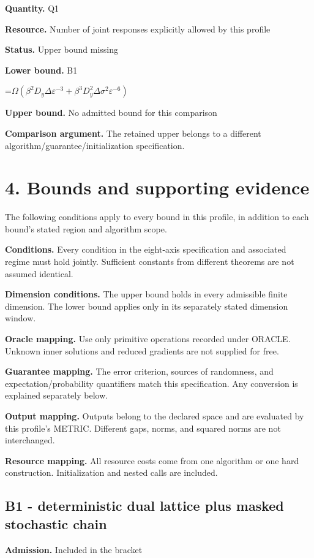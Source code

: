 \documentclass[10pt,a4paper]{article}
\newcommand{\AtlasMath}[1]{\par\begingroup\centering\setbox0=\hbox{$\displaystyle #1$}\ifdim\wd0>1.4\linewidth\typeout{ATLAS WIDE FORMULA: \the\wd0}\fi\ifdim\wd0>\linewidth\resizebox{\linewidth}{!}{\box0}\else\box0\fi\par\endgroup}
\begin{document}
\textbf{Quantity.} Q1

\textbf{Resource.} Number of joint responses explicitly allowed by this profile

\textbf{Status.} Upper bound missing

\textbf{Lower bound.} B1

\AtlasMath{\Omega(\beta^2D_y\Delta\varepsilon^{-3}+\beta^3D_y^2\Delta\sigma^2\varepsilon^{-6})}
\textbf{Upper bound.} No admitted bound for this comparison

\textbf{Comparison argument.} The retained upper belongs to a different algorithm/guarantee/initialization specification.

\section{4. Bounds and supporting evidence}
The following conditions apply to every bound in this profile, in addition to each bound's stated region and algorithm scope.

\textbf{Conditions.} Every condition in the eight-axis specification and associated regime must hold jointly. Sufficient constants from different theorems are not assumed identical.

\textbf{Dimension conditions.} The upper bound holds in every admissible finite dimension. The lower bound applies only in its separately stated dimension window.

\textbf{Oracle mapping.} Use only primitive operations recorded under ORACLE. Unknown inner solutions and reduced gradients are not supplied for free.

\textbf{Guarantee mapping.} The error criterion, sources of randomness, and expectation/probability quantifiers match this specification. Any conversion is explained separately below.

\textbf{Output mapping.} Outputs belong to the declared space and are evaluated by this profile's METRIC. Different gaps, norms, and squared norms are not interchanged.

\textbf{Resource mapping.} All resource costs come from one algorithm or one hard construction. Initialization and nested calls are included.

\subsection{B1 - deterministic dual lattice plus masked stochastic chain}
\textbf{Admission.} Included in the bracket
\end{document}
